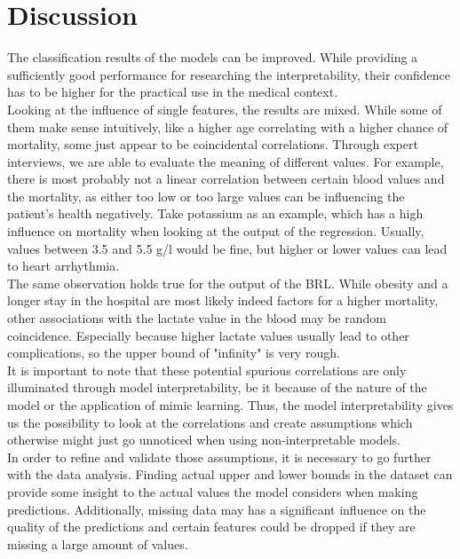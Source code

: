 \documentclass[conference,comsoc]{IEEEtran}
\begin{document}
\section{Discussion}
\label{sec:discussion}
The classification results of the models can be improved.
While providing a sufficiently good performance for researching the interpretability, their confidence has to be higher for the practical use in the medical context. \\
Looking at the influence of single features, the results are mixed.
While some of them make sense intuitively, like a higher age correlating with a higher chance of mortality, some just appear to be coincidental correlations.
Through expert interviews, we are able to evaluate the meaning of different values.
For example, there is most probably not a linear correlation between certain blood values and the mortality, as either too low or too large values can be influencing the patient's health negatively.
Take potassium as an example, which has a high influence on mortality when looking at the output of the regression.
Usually, values between 3.5 and 5.5 \textmu g/l would be fine, but higher or lower values can lead to heart arrhythmia. \\
The same observation holds true for the output of the BRL.
While obesity and a longer stay in the hospital are most likely indeed factors for a higher mortality, other associations with the lactate value in the blood may be random coincidence.
Especially because higher lactate values usually lead to other complications, so the upper bound of "infinity" is very rough. \\
It is important to note that these potential spurious correlations are only illuminated through model interpretability, be it because of the nature of the model or the application of mimic learning.
Thus, the model interpretability gives us the possibility to look at the correlations and create assumptions which otherwise might just go unnoticed when using non-interpretable models. \\
In order to refine and validate those assumptions, it is necessary to go further with the data analysis.
Finding actual upper and lower bounds in the dataset can provide some insight to the actual values the model considers when making predictions.
Additionally, missing data may has a significant influence on the quality of the predictions and certain features could be dropped if they are missing a large amount of values. \\
\end{document}
